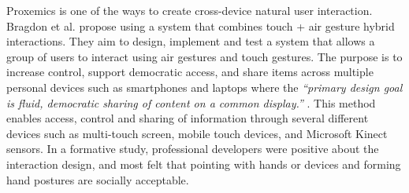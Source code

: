 Proxemics is one of the ways to create cross-device natural user interaction.
Bragdon et al. propose using a system that combines touch + air gesture hybrid interactions.
They aim to design, implement and test a system that allows a group of users to interact using air gestures and touch gestures. 
The purpose is to increase control, support democratic access, and share items across multiple personal devices such as smartphones and laptops where the {\em``primary design goal is fluid, democratic sharing of content on a common display.''} \cite{Bragton:2011}. This method enables access, control and sharing of information through several different devices such as multi-touch screen, mobile touch devices, and Microsoft Kinect sensors. In a formative study, professional developers were positive about the interaction design, and most felt that pointing with hands or devices and forming hand postures are socially acceptable. 